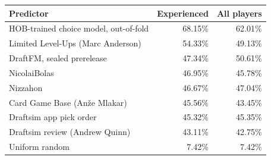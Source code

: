 \begin{tabular}{lrr}
\toprule
Predictor & Experienced & All players \\
\midrule
HOB-trained choice model, out-of-fold & 68.15\% & 62.01\% \\
Limited Level-Ups (Marc Anderson) & 54.33\% & 49.13\% \\
DraftFM, sealed prerelease & 47.34\% & 50.61\% \\
NicolaiBolas & 46.95\% & 45.78\% \\
Nizzahon & 46.67\% & 47.04\% \\
Card Game Base (Anže Mlakar) & 45.56\% & 43.45\% \\
Draftsim app pick order & 45.32\% & 45.35\% \\
Draftsim review (Andrew Quinn) & 43.11\% & 42.75\% \\
Uniform random & 7.42\% & 7.42\% \\
\bottomrule
\end{tabular}
